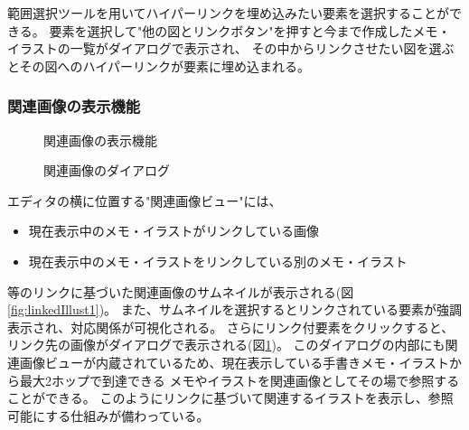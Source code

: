 範囲選択ツールを用いてハイパーリンクを埋め込みたい要素を選択することができる。
要素を選択して"他の図とリンクボタン"を押すと今まで作成したメモ・イラストの一覧がダイアログで表示され、
その中からリンクさせたい図を選ぶとその図へのハイパーリンクが要素に埋め込まれる。

\subsubsection{関連画像の表示機能}

\begin{figure}[htbp] \begin{minipage}{0.5\hsize}
                         \begin{center} 
                         \end{center} \caption{関連画像の表示機能} \label{fig:linkedIllust1}
\end{minipage} \begin{minipage}{0.5\hsize}
                   \begin{center} 
                   \end{center} \caption{関連画像のダイアログ} \label{fig:linkedIllust2}
\end{minipage}
\end{figure}

エディタの横に位置する"関連画像ビュー"には、
\begin{itemize}
    \item 現在表示中のメモ・イラストがリンクしている画像
    \item 現在表示中のメモ・イラストをリンクしている別のメモ・イラスト
\end{itemize}等のリンクに基づいた関連画像のサムネイルが表示される(図\ref{fig:linkedIllust1})。
また、サムネイルを選択するとリンクされている要素が強調表示され、対応関係が可視化される。
さらにリンク付要素をクリックすると、リンク先の画像がダイアログで表示される(図\ref{fig:linkedIllust2})。
このダイアログの内部にも関連画像ビューが内蔵されているため、現在表示している手書きメモ・イラストから最大2ホップで到達できる
メモやイラストを関連画像としてその場で参照することができる。
このようにリンクに基づいて関連するイラストを表示し、参照可能にする仕組みが備わっている。

